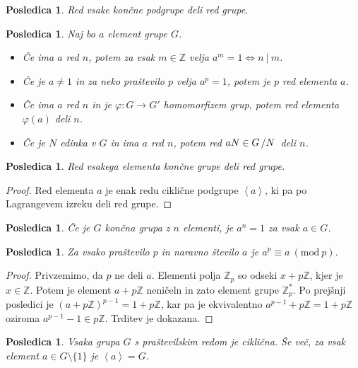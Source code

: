 \documentclass[10pt, a4paper]{article}
\newtheorem{posledica}[izr]{Posledica}
\newenvironment{noticeC}{%
  \tcolorbox[%
  notitle,
  empty,
  enhanced,  %
  breakable,
  coltext=black, 
  fontupper=\rmfamily,
  parbox=false,
  noparskip,
  sharp corners,
  boxrule=-1pt,  %
  frame hidden,
  left=7pt,  %
  right=7pt,
  top=5pt,
  bottom=5pt,
  before skip=2.5ex plus 2pt,
  after skip=2.5ex plus 2pt,
  overlay unbroken and last={%
  },
  ]}
{\endtcolorbox}
\newenvironment{dokaz}%
  {\begin{noticeC}\begin{proof}}%
  {\end{proof}\end{noticeC}}
\newcommand{\Z}{\mathbb {Z}}
\newcommand{\quot}[2]{{\raisebox{0em}{$#1$}\left/\raisebox{0em}{$#2$}\right.}}
\newcommand{\gen}[1]{\left\langle #1 \right\rangle}
\newcommand{\Mod}[1]{\ (\mathrm{mod}\ #1)}
\begin{document}
\begin{posledica}
  Red vsake končne podgrupe deli red grupe.
\end{posledica}

\begin{posledica}\label{pos:1}
  Naj bo $a$ element grupe $G$.
  \begin{itemize}
    \item Če ima $a$ red $n$, potem za vsak $m \in \Z$ velja $a^m = 1 \Leftrightarrow n\ |\ m$.
    \item Če je $a \neq 1$ in za neko praštevilo $p$ velja $a^p = 1$, potem je $p$ red elementa $a$.
    \item Če ima $a$ red $n$ in je $\varphi: G \to G'$ homomorfizem grup, potem red elementa $\varphi(a)$ deli $n$.
    \item Če je $N$ edinka v $G$ in ima $a$ red $n$, potem red $aN \in \quot{G}{N}$ deli $n$.
  \end{itemize}
\end{posledica}

\begin{posledica}
  Red vsakega elementa končne grupe deli red grupe.
\end{posledica}

\begin{dokaz}
  Red elementa $a$ je enak redu ciklične podgrupe $\gen{a}$, ki pa po Lagrangevem izreku deli red grupe.
\end{dokaz}

\begin{posledica}
  Če je $G$ končna grupa z $n$ elementi, je $a^n = 1$ za vsak $a \in G$.
\end{posledica}

\begin{posledica}
  Za vsako praštevilo $p$ in naravno število $a$ je $a^p \equiv a \Mod{p}$.
\end{posledica}

\begin{dokaz}
  Privzemimo, da $p$ ne deli $a$. Elementi polja $\Z_p$ so odseki $x + p\Z$,
  kjer je $x \in \Z$. Potem je element $a + p\Z$ neničeln in zato element 
  grupe $\Z_p^*$. Po prejšnji posledici je $(a + p\Z)^{p -1} = 1 + p\Z$,
  kar pa je ekvivalentno $a^{p-1} + p\Z = 1 + p\Z$ oziroma $a^{p-1} -1 \in p\Z$.
  Trditev je dokazana.
\end{dokaz}

\begin{posledica}
  Vsaka grupa $G$ s praštevilskim redom je ciklična.
  Še več, za vsak element $a \in G \setminus \{1\}$ je $\gen{a} = G$.
\end{posledica}
\end{document}
